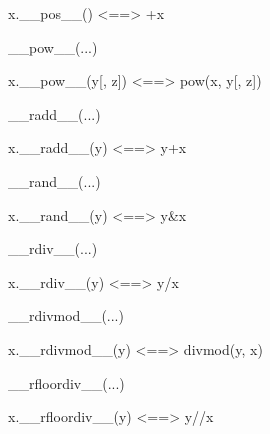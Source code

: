 \documentclass[letterpaper,10pt,english]{sphinxmanual}
\begin{document}
\begin{description}
\begin{description}
\begin{DUlineblock}{0em}
\begin{DUlineblock}{\DUlineblockindent}
\item[] x.\_\_pos\_\_() \textless{}==\textgreater{} +x
\item[] 
\end{DUlineblock}
\item[] \_\_pow\_\_(...)
\item[]
\begin{DUlineblock}{\DUlineblockindent}
\item[] x.\_\_pow\_\_(y{[}, z{]}) \textless{}==\textgreater{} pow(x, y{[}, z{]})
\item[] 
\end{DUlineblock}
\item[] \_\_radd\_\_(...)
\item[]
\begin{DUlineblock}{\DUlineblockindent}
\item[] x.\_\_radd\_\_(y) \textless{}==\textgreater{} y+x
\item[] 
\end{DUlineblock}
\item[] \_\_rand\_\_(...)
\item[]
\begin{DUlineblock}{\DUlineblockindent}
\item[] x.\_\_rand\_\_(y) \textless{}==\textgreater{} y\&x
\item[] 
\end{DUlineblock}
\item[] \_\_rdiv\_\_(...)
\item[]
\begin{DUlineblock}{\DUlineblockindent}
\item[] x.\_\_rdiv\_\_(y) \textless{}==\textgreater{} y/x
\item[] 
\end{DUlineblock}
\item[] \_\_rdivmod\_\_(...)
\item[]
\begin{DUlineblock}{\DUlineblockindent}
\item[] x.\_\_rdivmod\_\_(y) \textless{}==\textgreater{} divmod(y, x)
\item[] 
\end{DUlineblock}
\item[] \_\_rfloordiv\_\_(...)
\item[]
\begin{DUlineblock}{\DUlineblockindent}
\item[] x.\_\_rfloordiv\_\_(y) \textless{}==\textgreater{} y//x

\end{DUlineblock}
\end{DUlineblock}
\end{description}
\end{description}
\end{document}
